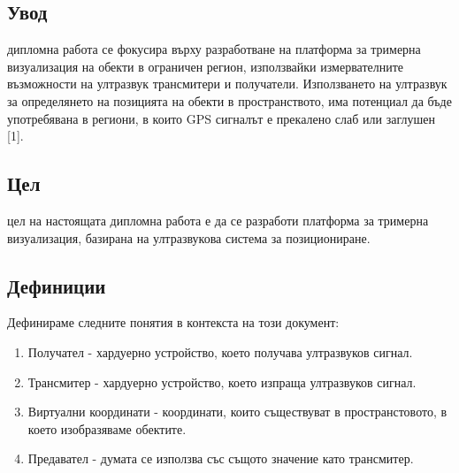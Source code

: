\subsection{Увод}
 дипломна работа се фокусира върху разработване на платформа за тримерна визуализация на обекти в ограничен регион, използвайки измервателните възможности на ултразвук трансмитери и получатели. Използването на ултразвук за определянето на позицията на обекти в пространството, има потенциал да бъде употребявана в региони, в които GPS сигналът е прекалено слаб или заглушен [1].

\subsection{Цел}
 цел на настоящата дипломна работа е да се разработи платформа за тримерна визуализация, базирана на ултразвукова система за позициониране.

\subsection{Дефиниции}
Дефинираме следните понятия в контекста на този документ:
\begin{enumerate}
    \item Получател - хардуерно устройство, което получава ултразвуков сигнал.
    \item Трансмитер - хардуерно устройство, което изпраща ултразвуков сигнал.
    \item Виртуални координати - координати, които съществуват в пространстовото, в което изобразяваме обектите.
    \item Предавател - думата се използва със същото значение като трансмитер.
\end{enumerate}

